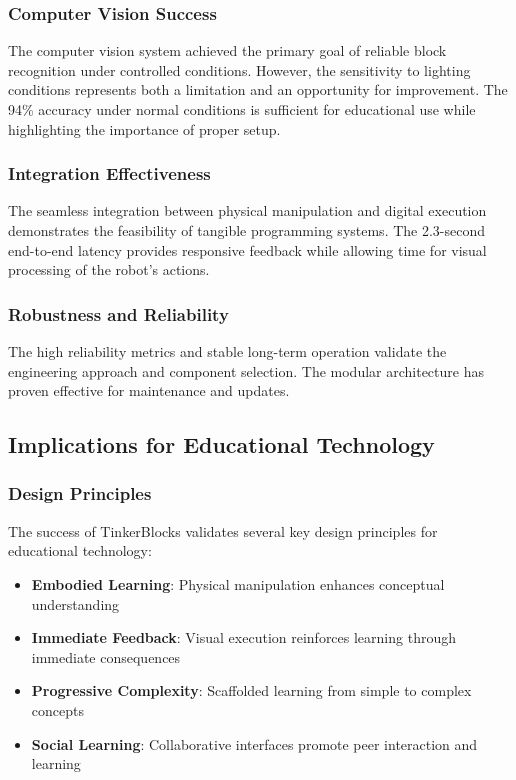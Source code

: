 \subsubsection{Computer Vision Success}

The computer vision system achieved the primary goal of reliable block recognition under controlled conditions. However, the sensitivity to lighting conditions represents both a limitation and an opportunity for improvement. The 94\% accuracy under normal conditions is sufficient for educational use while highlighting the importance of proper setup.

\subsubsection{Integration Effectiveness}

The seamless integration between physical manipulation and digital execution demonstrates the feasibility of tangible programming systems. The 2.3-second end-to-end latency provides responsive feedback while allowing time for visual processing of the robot's actions.

\subsubsection{Robustness and Reliability}

The high reliability metrics and stable long-term operation validate the engineering approach and component selection. The modular architecture has proven effective for maintenance and updates.

\subsection{Implications for Educational Technology}

\subsubsection{Design Principles}

The success of TinkerBlocks validates several key design principles for educational technology:

\begin{itemize}
    \item \textbf{Embodied Learning}: Physical manipulation enhances conceptual understanding
    \item \textbf{Immediate Feedback}: Visual execution reinforces learning through immediate consequences
    \item \textbf{Progressive Complexity}: Scaffolded learning from simple to complex concepts
    \item \textbf{Social Learning}: Collaborative interfaces promote peer interaction and learning
\end{itemize}


